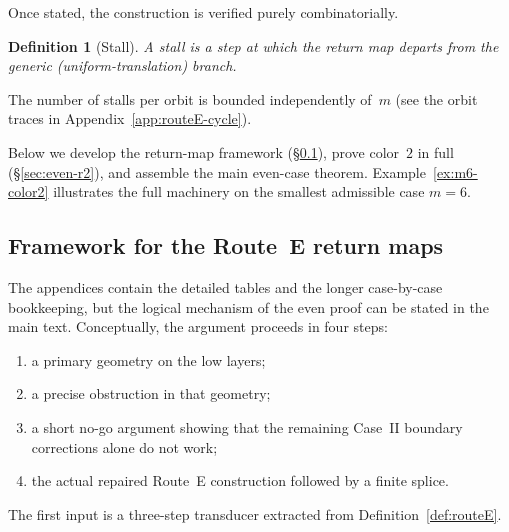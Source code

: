 \documentclass[11pt]{article}
\newtheorem{definition}{Definition}
\begin{document}
Once stated, the construction is verified purely combinatorially.

\begin{definition}[Stall]\label{def:stall}
A \emph{stall} is a step at which the return map departs from the generic (uniform-translation) branch.
\end{definition}

\noindent
The number of stalls per orbit is bounded independently of~$m$ (see the orbit traces in Appendix~\ref{app:routeE-cycle}).

Below we develop the return-map framework (\S\ref{sec:framework}), prove color~$2$ in full (\S\ref{sec:even-r2}), and assemble the main even-case theorem.
Example~\ref{ex:m6-color2} illustrates the full machinery on the smallest admissible case $m=6$.

\subsection{Framework for the Route~E return maps}\label{sec:framework}

The appendices contain the detailed tables and the longer case-by-case bookkeeping, but the logical mechanism of the even proof can be stated in the main text.
Conceptually, the argument proceeds in four steps:
\begin{enumerate}[label=\textup{(\roman*)},leftmargin=2.5em]
\item a primary geometry on the low layers;
\item a precise obstruction in that geometry;
\item a short no-go argument showing that the remaining Case~II boundary corrections alone do not work;
\item the actual repaired Route~E construction followed by a finite splice.
\end{enumerate}
The first input is a three-step transducer extracted from Definition~\ref{def:routeE}.
\end{document}
